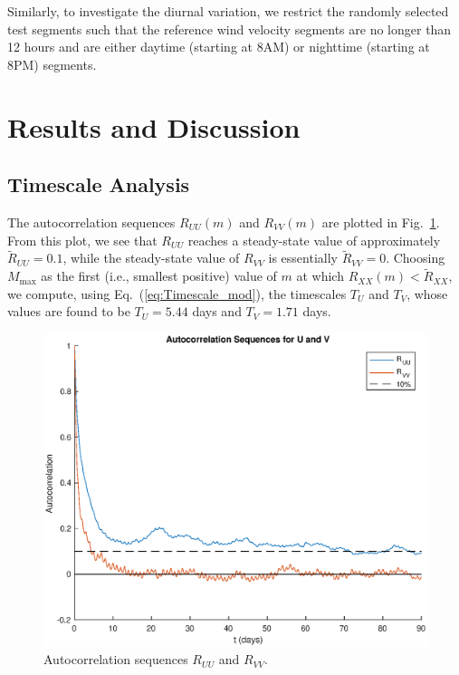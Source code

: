 \documentclass[11pt, oneside]{article}
\newcommand{\figref}[1]{Fig.~\ref{#1}}
\newcommand{\eqnref}[1]{Eq.~(\ref{#1})}
\begin{document}
Similarly, to investigate the diurnal variation, we restrict the randomly selected test segments such that the reference wind velocity segments are no longer than 12 hours and are either daytime (starting at 8AM) or nighttime (starting at 8PM) segments.

\section{Results and Discussion}\label{sec:Results}

\subsection{Timescale Analysis}\label{sec:Results:Timescale}
The autocorrelation sequences $R_{UU}(m)$ and $R_{VV}(m)$ are plotted in \figref{fig:Autocorrelations}.
From this plot, we see that $R_{UU}$ reaches a steady-state value of approximately $\tilde{R}_{UU} = 0.1$, while the steady-state value of $R_{VV}$ is essentially $\tilde{R}_{VV} = 0$.
Choosing $M_\text{max}$ as the first (i.e., smallest positive) value of $m$ at which $R_{XX}(m) < \tilde{R}_{XX}$, we compute, using \eqnref{eq:Timescale_mod}, the timescales $T_U$ and $T_V$,
whose values are found to be $T_U = 5.44$ days and $T_V = 1.71$ days.

\begin{figure}[htb]
\centering
\includegraphics[width=\columnwidth]{figures/AutocorrelationSequences_90days}
\caption{Autocorrelation sequences $R_{UU}$ and $R_{VV}$.}
\label{fig:Autocorrelations}
\end{figure}
\end{document}
